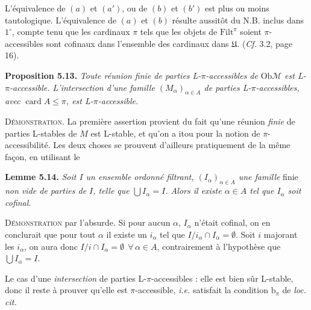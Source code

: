 \documentclass[11pt]{article}
\newcommand{\printedpage}[1]{\marginpar{\footnotesize p.~#1}}
\newcommand{\msp}[1]{\marginpar{\footnotesize [#1]}}
\newcommand{\Filt}{\mathrm{Filt}}
\newcommand{\Ob}{\mathrm{Ob}}
\newcommand{\card}{\operatorname{card}}
\begin{document}
\printedpage{39}

\msp{page 67}
L'équivalence de $(a)$ et $(a')$, ou de $(b)$ et $(b')$ est plus ou moins tautologique. L'équivalence de $(a)$ et $(b)$ résulte aussitôt du N.B. inclus dans $1^{\circ}$, compte tenu que les cardinaux $\pi$ tels que les objets de $\Filt^{\pi}$ soient $\pi$-accessibles sont cofinaux dans l'ensemble des cardinaux dans $\mathfrak{U}$. (\textit{Cf.} 3.2, page 16).

\textbf{Proposition 5.13.} \textit{Toute réunion finie de parties L-$\pi$-accessibles de} $\Ob\mathcal{M}$ \textit{est L-$\pi$-accessible. L'intersection d'une famille $(M_{\alpha})_{\alpha\in A}$ de parties L-$\pi$-accessibles, avec} $\card A \leq \pi$\textit{, est L-$\pi$-accessible.}

\textsc{Démonstration}. La première assertion provient du fait qu'une réunion \textit{finie} de parties L-stables de $M$ est L-stable, et qu'on a itou pour la notion de $\pi$-accessibilité. Les deux choses se prouvent d'ailleurs pratiquement de la même façon, en utilisant le

\textbf{Lemme 5.14.} \textit{Soit $I$ un ensemble ordonné filtrant, $(I_{\alpha})_{\alpha\in A}$ une famille} finie \textit{non vide de parties de $I$, telle que $\bigcup I_{\alpha} = I$. Alors il existe $\alpha \in A$ tel que $I_{\alpha}$ soit cofinal.}

\msp{page 68}
\textsc{Démonstration} par l'absurde. Si pour aucun $\alpha$, $I_{\alpha}$ n'était cofinal, on en conclurait que pour tout $\alpha$ il existe un $i_{\alpha}$ tel que $I/i_{\alpha} \cap I_{\alpha} = \emptyset$. Soit $i$ majorant les $i_{\alpha}$, on aura donc $I/i \cap I_{\alpha} = \emptyset \ \ \forall\, \alpha \in A$, contrairement à l'hypothèse que $\bigcup I_{\alpha} = I$.

Le cas d'une \textit{intersection} de parties L-$\pi$-accessibles : elle est bien sûr L-stable, donc il reste à prouver qu'elle est $\pi$-accessible, \textit{i.e.} satisfait la condition $\mathrm{b}_{\pi}$ de \textit{loc. cit.}
\end{document}

